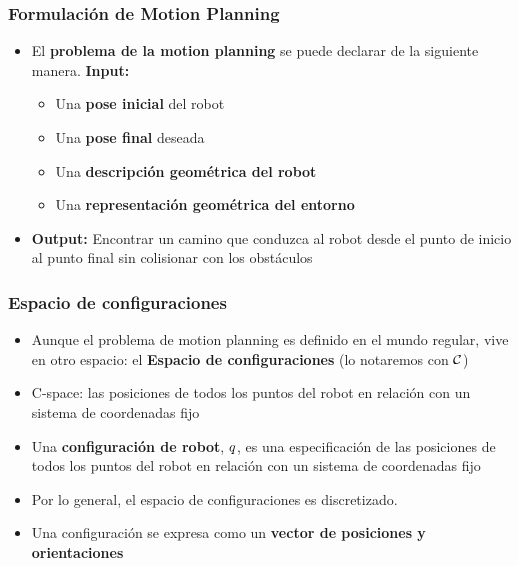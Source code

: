 %    
%
%    

\begin{frame}
    \frametitle{Formulación de Motion Planning}
    
    \begin{itemize}
        \item El {\bf problema de la motion planning} se puede declarar de la siguiente manera. \textbf{Input:}
        \begin{itemize}
            \item Una \textbf{pose inicial} del robot
            \item Una \textbf{pose final} deseada
            \item Una \textbf{descripción geométrica del robot}
            \item Una \textbf{representación geométrica del entorno}
        \end{itemize}
        \item \textbf{Output:} Encontrar un camino que conduzca al robot desde el punto de inicio al punto final sin colisionar con los obstáculos
    \end{itemize}
\end{frame}

\begin{frame}
    \frametitle{Espacio de configuraciones}
    
    \begin{itemize}
        \item Aunque el problema de motion planning es definido en el mundo regular, vive en otro espacio: el {\bf Espacio de configuraciones} (lo notaremos con $\mathcal{C}$)
        \item C-space: las posiciones de todos los puntos del robot en relación con un sistema de coordenadas fijo
        \item Una {\bf configuración de robot}, $q$, es una especificación de las posiciones de todos los puntos del robot en relación con un sistema de coordenadas fijo
        \item Por lo general, el espacio de configuraciones es discretizado.
        \item Una configuración se expresa como un {\bf vector de posiciones y orientaciones}
    \end{itemize}
    
\end{frame}

